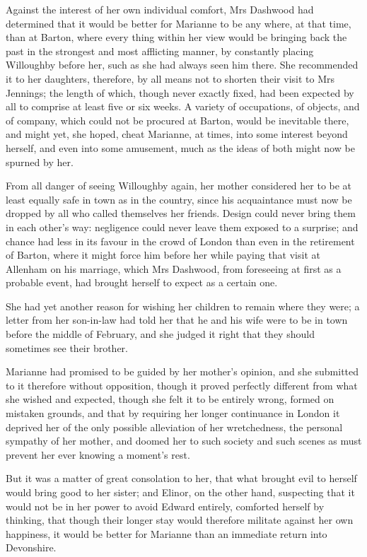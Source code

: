 Against the interest of her own individual comfort, Mrs Dashwood had determined that it would be better for Marianne to be any where, at that time, than at Barton, where every thing within her view would be bringing back the past in the strongest and most afflicting manner, by constantly placing Willoughby before her, such as she had always seen him there. She recommended it to her daughters, therefore, by all means not to shorten their visit to Mrs Jennings; the length of which, though never exactly fixed, had been expected by all to comprise at least five or six weeks. A variety of occupations, of objects, and of company, which could not be procured at Barton, would be inevitable there, and might yet, she hoped, cheat Marianne, at times, into some interest beyond herself, and even into some amusement, much as the ideas of both might now be spurned by her.

From all danger of seeing Willoughby again, her mother considered her to be at least equally safe in town as in the country, since his acquaintance must now be dropped by all who called themselves her friends. Design could never bring them in each other’s way: negligence could never leave them exposed to a surprise; and chance had less in its favour in the crowd of London than even in the retirement of Barton, where it might force him before her while paying that visit at Allenham on his marriage, which Mrs Dashwood, from foreseeing at first as a probable event, had brought herself to expect as a certain one.

She had yet another reason for wishing her children to remain where they were; a letter from her son-in-law had told her that he and his wife were to be in town before the middle of February, and she judged it right that they should sometimes see their brother.

Marianne had promised to be guided by her mother’s opinion, and she submitted to it therefore without opposition, though it proved perfectly different from what she wished and expected, though she felt it to be entirely wrong, formed on mistaken grounds, and that by requiring her longer continuance in London it deprived her of the only possible alleviation of her wretchedness, the personal sympathy of her mother, and doomed her to such society and such scenes as must prevent her ever knowing a moment’s rest.

But it was a matter of great consolation to her, that what brought evil to herself would bring good to her sister; and Elinor, on the other hand, suspecting that it would not be in her power to avoid Edward entirely, comforted herself by thinking, that though their longer stay would therefore militate against her own happiness, it would be better for Marianne than an immediate return into Devonshire.

